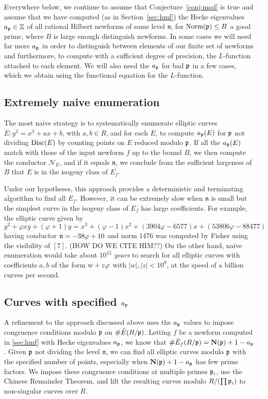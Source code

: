 \documentclass{amsart}
\newcommand{\n}{\mathfrak{n}}
\newcommand{\cN}{\mathcal{N}}
\begin{document}
Everywhere below, we continue to assume that Conjecture~\ref{conj:mod}
is true and assume that we have computed (as in Section~\ref{sec:hmf})
the Hecke eigenvalues $a_{\mathfrak{p}}\in \mathbb{Z}$ of all rational Hilbert newforms of
some level $\n$, for $\operatorname{Norm}(\mathfrak{p})\leq B$ a good prime, where $B$ is
large enough distinguish newforms. In some cases we will need far more
$a_{\mathfrak{p}}$ in order to distinguish between elements of our finite set of
newforms and furthermore, to compute with a sufficient degree of
precision, the $L$-function attached to each element.  We will also
need the $a_{\mathfrak{p}}$ for bad $\mathfrak{p}$ in a few cases, which we obtain
using the functional equation for the $L$-function.

\subsection{Extremely naive enumeration}\label{sec:naive}

The most naive strategy is to systematically enumerate 
 elliptic curves $E: y^2 = x^3 + ax + b$, with $a,b\in R$,
and for each $E$, to compute $a_{\mathfrak{p}}(E)$ for $\mathfrak{p}$ not dividing $\operatorname{Disc}(E)$
 by counting points on $E$ reduced modulo $\mathfrak{p}$.  If all the $a_{\mathfrak{p}}(E)$ match
 with those of the input newform $f$ up to the bound $B$, we then compute
 the conductor $\cN_E$, and if it equals $\n$, we conclude from the sufficient 
largeness of $B$ that $E$ is in the isogeny class of $E_f$.

Under our hypotheses, this approach provides a deterministic and 
terminating algorithm to find all $E_f$. However, it can be extremely slow
 when $\n$ is small but the simplest curve in the isogeny class 
of $E_f$ has large coefficients.  For example, the elliptic curve given by 
$$y^2 + \varphi xy  + (\varphi+1)y = x^3 + (\varphi-1)x^2 + (3904\varphi-6577)x + (53806\varphi-88477)$$ having 
 conductor $\n = -38 \vphi + 10$ and norm $1476$ was computed by Fisher
 using the visibility of \Sha$[7]$. (HOW DO WE CITE HIM??) 
On the other hand, naive enumeration would take about $10^{15}$ {\em years} to
 search for all elliptic curves with coefficients $a,b$ of the form
 $w+z\varphi$ with $|w|,|z| <10^8$, at the speed of a billion curves per second.


\subsection{Curves with specified $a_{\mathfrak{p}}$}

A refinement to the approach discussed above uses the $a_{\mathfrak{p}}$ values to impose
congruence conditions modulo $\mathfrak{p}$ on $\#\tilde E(R/\mathfrak{p})$.
Letting $f$ be a newform computed in \ref{sec:hmf} with Hecke eigenvalues
$a_{\mathfrak{p}}$, we know that $\#\tilde E_f(R/\mathfrak{p})=\mathbf{N}(\mathfrak{p})+1-a_{\mathfrak{p}}$.
Given $\mathfrak{p}$ not dividing the level $\n$, we can find all elliptic curves
modulo $\mathfrak{p}$ with the specified number of points, especially when $\mathbf{N}(\mathfrak{p}) +1 - a_{\mathfrak{p}}$ has
few prime factors. We impose these congruence conditions at multiple primes $\mathfrak{p}_i$,
use the Chinese Remainder Theorem, and lift the resulting curves modulo $R/ (\small\prod \mathfrak{p}_i)$
to non-singular curves over $R$.
\end{document}
